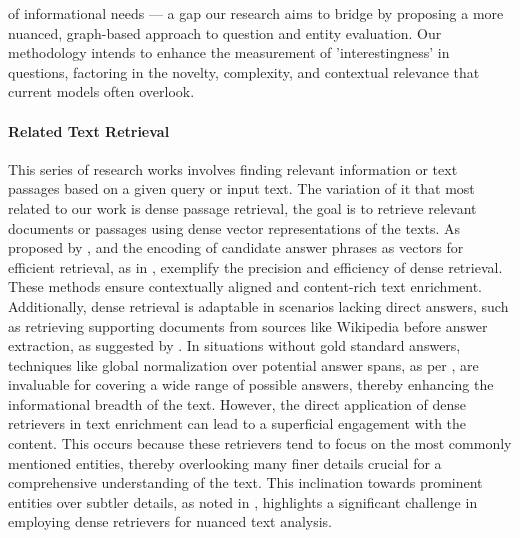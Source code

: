 \documentclass[11pt]{article}
\begin{document}
of informational needs — a gap our research aims to bridge by proposing a more nuanced, graph-based approach to question and entity evaluation. Our methodology intends to enhance the measurement of 'interestingness' in questions, factoring in the novelty, complexity, and contextual relevance that current models often overlook.

\paragraph{Related Text Retrieval} This series of research works involves finding relevant information or text passages based on a given query or input text. The variation of it that most related to our work is dense passage retrieval, the goal is to retrieve relevant documents or passages using dense vector representations of the texts. As proposed by \cite{DBLP:conf/iclr/DasDZM19}, and the encoding of candidate answer phrases as vectors for efficient retrieval, as in \cite{DBLP:journals/corr/abs-1906-05807}, exemplify the precision and efficiency of dense retrieval. These methods ensure contextually aligned and content-rich text enrichment. Additionally, dense retrieval is adaptable in scenarios lacking direct answers, such as retrieving supporting documents from sources like Wikipedia before answer extraction, as suggested by \cite{DBLP:conf/acl/ChenFWB17}. In situations without gold standard answers, techniques like global normalization over potential answer spans, as per \cite{DBLP:conf/acl/GardnerC18}, are invaluable for covering a wide range of possible answers, thereby enhancing the informational breadth of the text. However, the direct application of dense retrievers in text enrichment can lead to a superficial engagement with the content. This occurs because these retrievers tend to focus on the most commonly mentioned entities, thereby overlooking many finer details crucial for a comprehensive understanding of the text. This inclination towards prominent entities over subtler details, as noted in \cite{sciavolino2021simple}, highlights a significant challenge in employing dense retrievers for nuanced text analysis.

\end{document}
